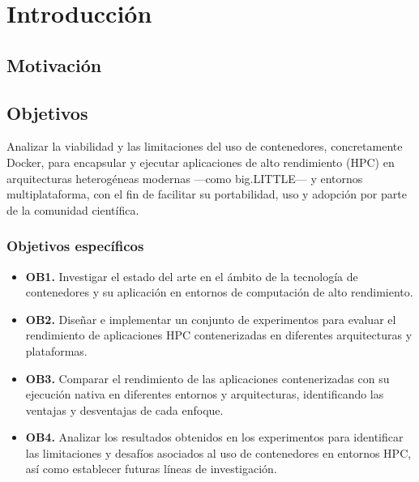 \chapter{Introducción}\label{cap:introduccion}



\section{Motivación}\label{sec:motivacion}

\section{Objetivos}\label{sec:objetivos}

Analizar la viabilidad y las limitaciones del uso de contenedores, concretamente Docker, para encapsular y ejecutar aplicaciones de alto rendimiento (HPC) en arquitecturas heterogéneas modernas —como big.LITTLE— y entornos multiplataforma, con el fin de facilitar su portabilidad, uso y adopción por parte de la comunidad científica.

\subsection{Objetivos específicos}\label{subsec:objetivos_especificos}

\begin{itemize}
   \item \textbf{OB1.} Investigar el estado del arte en el ámbito de la tecnología de contenedores y su aplicación en entornos de computación de alto rendimiento.
   \item \textbf{OB2.} Diseñar e implementar un conjunto de experimentos para evaluar el rendimiento de aplicaciones HPC contenerizadas en diferentes arquitecturas y plataformas.
   \item \textbf{OB3.} Comparar el rendimiento de las aplicaciones contenerizadas con su ejecución nativa en diferentes entornos y arquitecturas, identificando las ventajas y desventajas de cada enfoque.
   \item \textbf{OB4.} Analizar los resultados obtenidos en los experimentos para identificar las limitaciones y desafíos asociados al uso de contenedores en entornos HPC, así como establecer futuras líneas de investigación.
\end{itemize}

